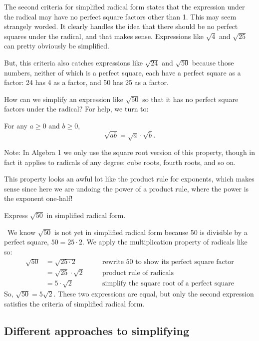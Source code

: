 The second criteria for simplified radical form states that the expression under the radical may have no perfect square factors other than 1. This may seem strangely worded. It clearly handles the idea that there should be no perfect squares under the radical, and that makes sense. Expressions like $\sqrt{4}$ and $\sqrt{25}$ can pretty obviously be simplified.

But, this criteria also catches expressions like $\sqrt{24}$ and $\sqrt{50}$ because those numbers, neither of which is a perfect square, each have a perfect square as a factor: 24 has 4 as a factor, and 50 has 25 as a factor.

How can we simplify an expression like $\sqrt{50}$ so that it has no perfect square factors under the radical? For help, we turn to:

\begin{boxeddef}
For any $a \geq 0$ and $b \geq 0$, \[\sqrt{ab} = \sqrt{a} \cdot \sqrt{b}.\]

Note: In Algebra 1 we only use the square root version of this property, though in fact it applies to radicals of any degree: cube roots, fourth roots, and so on.
\end{boxeddef}

This property looks an awful lot like the product rule for exponents, which makes sense since here we are undoing the power of a product rule, where the power is the exponent one-half!

\begin{boxedex}
Express $\sqrt{50}$ in simplified radical form.

\exsoln\ We know $\sqrt{50}$ is not yet in simplified radical form because 50 is divisible by a perfect square, $50 = 25 \cdot 2$. We apply the multiplication property of radicals like so:
\[
\begin{aligned}
\sqrt{50} 	&= \sqrt{25 \cdot 2}
&& \quad \text{rewrite 50 to show its perfect square factor}\\
			&= \sqrt{25} \cdot \sqrt{2}
&& \quad \text{product rule of radicals}\\
			&= 5 \cdot \sqrt{2}
&& \quad \text{simplify the square root of a perfect square}
\end{aligned}
\]
So, $\sqrt{50} = 5\sqrt{2}$. These two expressions are equal, but only the second expression satisfies the criteria of simplified radical form.
\end{boxedex}

\subsection{Different approaches to simplifying}

